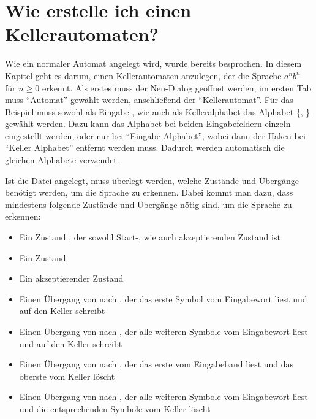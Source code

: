 

\chapter{Wie erstelle ich einen Kellerautomaten?}\label{PDA}


Wie ein normaler Automat angelegt wird, wurde bereits besprochen. In diesem
Kapitel geht es darum, einen Kellerautomaten anzulegen, der die Sprache $a^n
b^n$ für $n \geq 0$ erkennt. Als erstes muss der Neu-Dialog geöffnet werden, im ersten
Tab muss "`Automat"' gewählt werden, anschließend der "`Kellerautomat"'. Für
das Beispiel muss sowohl als Eingabe-, wie auch als Kelleralphabet das Alphabet
\{, \} gewählt werden. Dazu kann das Alphabet bei beiden
Eingabefeldern einzeln eingestellt werden, oder nur bei "`Eingabe Alphabet"',
wobei dann der Haken bei "`Keller Alphabet"' entfernt werden muss. Dadurch werden
automatisch die gleichen Alphabete verwendet.\vspace{10pt}

Ist die Datei angelegt, muss überlegt werden, welche Zustände und Übergänge
benötigt werden, um die Sprache zu erkennen. Dabei kommt man dazu, dass
mindestens folgende Zustände und Übergänge nötig sind, um die Sprache zu
erkennen:

\begin{itemize}
  \item Ein Zustand , der sowohl Start-, wie auch akzeptierenden
  Zustand ist
  \item Ein Zustand 
  \item Ein akzeptierender Zustand 
  \item Einen Übergang von  nach , der das erste Symbol
   vom Eingabewort liest und auf den Keller schreibt
  \item Einen Übergang von  nach , der alle weiteren Symbole
   vom Eingabewort liest und auf den Keller schreibt
  \item Einen Übergang von  nach , der das erste 
  vom Eingabeband liest und das oberste  vom Keller löscht
  \item Einen Übergang von  nach , der alle weiteren
  Symbole  vom Eingabewort liest und die entsprechenden Symbole
   vom Keller löscht
\end{itemize}

